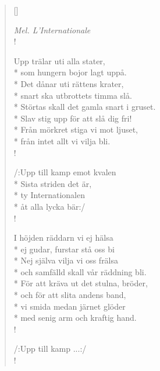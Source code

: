 \settowidth{\versewidth}{Störtas skall det gamla snart i gruset.}


\begin{verse}[\versewidth]

\flagverse{}
\emph{Mel. L'Internationale}\\!

Upp trälar uti alla stater,\\*
som hungern bojor lagt uppå.\\*
Det dånar uti rättens krater,\\*
snart ska utbrottets timma slå.\\*
Störtas skall det gamla snart i gruset.\\*
Slav stig upp för att slå dig fri!\\*
Från mörkret stiga vi mot ljuset,\\*
från intet allt vi vilja bli.\\!


/:Upp till kamp emot kvalen\\*
Sista striden det är,\\*
ty Internationalen\\*
åt alla lycka bär:/\\!


I höjden räddarn vi ej hälsa\\*
ej gudar, furstar stå oss bi\\*
Nej själva vilja vi oss frälsa\\*
och samfälld skall vår räddning bli.\\*
För att kräva ut det stulna, bröder,\\*
och för att slita andens band,\\*
vi smida medan järnet glöder\\*
med senig arm och kraftig hand.\\!


/:Upp till kamp ...:/\\!


\end{verse}

